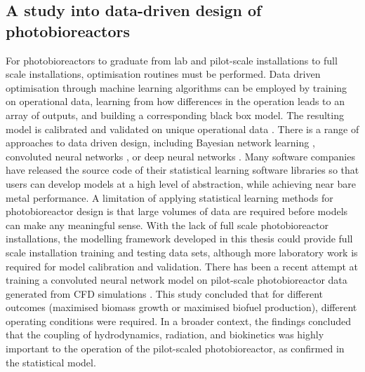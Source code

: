 \subsection{A study into data-driven design of photobioreactors}
For photobioreactors to graduate from lab and pilot-scale installations to full scale installations, optimisation routines must be performed. Data driven optimisation through machine learning algorithms can be employed by training on operational data, learning from how differences in the operation leads to an array of outputs, and building a corresponding black box model. The resulting model is calibrated and validated on unique operational data \cite{pedregosa2011}. There is a range of approaches to data driven design, including Bayesian network learning \cite{hu2018}, convoluted neural networks \cite{rio-chanona2019}, or deep neural networks \cite{deepa2018}. Many software companies have released the source code of their statistical learning software libraries so that users can develop models at a high level of abstraction, while achieving near bare metal performance.
\skippingparagraph
A limitation of applying statistical learning methods for photobioreactor design is that large volumes of data are required before models can make any meaningful sense. With the lack of full scale photobioreactor installations, the modelling framework developed in this thesis could provide full scale installation training and testing data sets, although more laboratory work is required for model calibration and validation. There has been a recent attempt at training a convoluted neural network model on pilot-scale photobioreactor data generated from CFD simulations \cite{rio-chanona2019}. This study concluded that for different outcomes (maximised biomass growth or maximised biofuel production), different operating conditions were required. In a broader context, the findings concluded that the coupling of hydrodynamics, radiation, and biokinetics was highly important to the operation of the pilot-scaled photobioreactor, as confirmed in the statistical model. 

